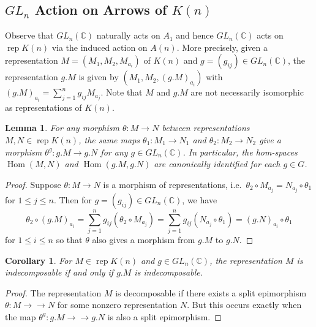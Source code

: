 \documentclass{amsart}
\newtheorem{corollary}[theorem]{Corollary}
\newtheorem{lemma}[theorem]{Lemma}
\newcommand{\rep}{\operatorname{rep}}
\newcommand{\CC}{\mathbb{C}}
\newcommand{\Hom}{\operatorname{Hom}}
\newcommand{\onto}{\to\!\!\!\!\!\to}
\begin{document}
\subsection{$GL_n$ Action on Arrows of $K(n)$}
Observe that $GL_n(\CC)$ naturally acts on $A_1$ and hence $GL_n(\CC)$ acts on $\rep K(n)$ via the induced action on $A(n)$.
More precisely, given a representation $M=(M_1,M_2,M_{a_i})$ of $K(n)$ and $g=(g_{ij})\in GL_n(\CC)$, the representation $g.M$ is given by $(M_1,M_2,(g.M)_{a_i})$ with $(g.M)_{a_i}=\sum\limits_{j=1}^n g_{ij}M_{a_j}$.
Note that $M$ and $g.M$ are not necessarily isomorphic as representations of $K(n)$.
\begin{lemma}
  \label{le:hom equivariance}
  For any morphism $\theta:M\to N$ between representations $M,N\in\rep K(n)$, the same maps $\theta_1:M_1\to N_1$ and $\theta_2:M_2\to N_2$ give a morphism $\theta^g:g.M\to g.N$ for any $g\in GL_n(\CC)$.
  In particular, the hom-spaces $\Hom(M,N)$ and $\Hom(g.M,g.N)$ are canonically identified for each $g\in G$.
\end{lemma}
\begin{proof}
  Suppose $\theta:M\to N$ is a morphism of representations, i.e.\ $\theta_2\circ M_{a_j}=N_{a_j}\circ\theta_1$ for $1\le j\le n$.
  Then for $g=(g_{ij})\in GL_n(\CC)$, we have
  \[\theta_2\circ (g.M)_{a_i}=\sum\limits_{j=1}^n g_{ij}(\theta_2\circ M_{a_j})=\sum\limits_{j=1}^n g_{ij}(N_{a_j}\circ\theta_1)=(g.N)_{a_i}\circ\theta_1\]
  for $1\le i\le n$ so that $\theta$ also gives a morphism from $g.M$ to $g.N$. 
\end{proof}
\begin{corollary}
  \label{cor:indecomposability}
  For $M\in\rep K(n)$ and $g\in GL_n(\CC)$, the representation $M$ is indecomposable if and only if $g.M$ is indecomposable.
\end{corollary}
\begin{proof}
  The representation $M$ is decomposable if there exists a split epimorphism $\theta:M\onto N$ for some nonzero representation $N$.
  But this occurs exactly when the map $\theta^g:g.M\onto g.N$ is also a split epimorphism.
\end{proof}

\end{document}
